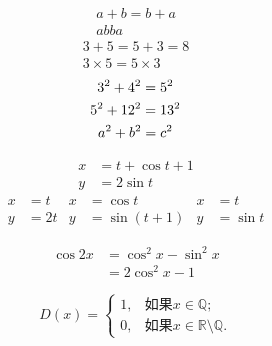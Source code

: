 \documentclass{ctexart}
\begin{document}
    \begin{gather}
        a + b = b + a   \\
        ab ba
    \end{gather}
    \begin{gather*}
        3 + 5 = 5 + 3 = 8   \\
        3 \times  5 = 5 \times 3
    \end{gather*}
    \begin{gather}
        3^2 + 4^2 = 5^2 \notag  \\
        5^2 + 12^2 = 13^2 \notag    \\
        a^2 + b^2 = c^2
    \end{gather}

    \begin{align}
        x &= t + \cos t + 1 \\
        y &= 2 \sin t
    \end{align}
    \begin{align*}
        x &= t  & x &= \cos t    & x &= t   \\
        y &= 2t & y &= \sin(t+1) & y &= \sin t
    \end{align*}

    \begin{equation}
        \begin{split}
            \cos 2x &= \cos^2 x - \sin^2 x  \\
                    &= 2\cos^2 x - 1
        \end{split}
    \end{equation}

    \begin{equation}
        D(x) = \begin{cases}  %
            1, & \text{如果} x \in \mathbb{Q};  \\
            0, & \text{如果} x \in \mathbb{R}\setminus\mathbb{Q}.
        \end{cases}
    \end{equation}
\end{document}
